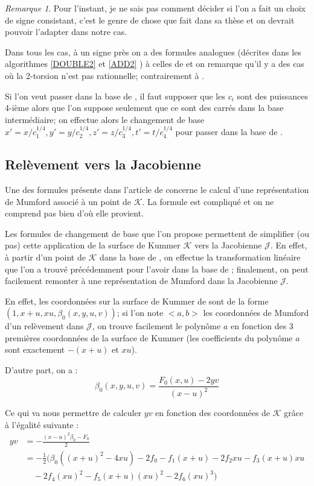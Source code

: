 \documentclass[a4paper]{article}
\theoremstyle{definition}
\theoremstyle{remark}
\newtheorem{remarque}{Remarque}
\numberwithin{equation}{section}
\begin{document}
\begin{remarque}
Pour l'instant, je ne sais pas comment décider si l'on a fait un choix de signe consistant, c'est le genre de chose que fait \citet{cosset} dans sa thèse et on devrait pouvoir l'adapter dans notre cas.
\end{remarque}

Dans tous les cas, à un signe près on a des formules analogues (décrites dans les algorithmes \ref{DOUBLE2} et \ref{ADD2} ) à celles de \citep{gaudry} et on remarque qu'il y a des cas où la 2-torsion n'est pas rationnelle; contrairement à \citep{gaudry}.

Si l'on veut passer dans la base de \citet{gaudry}, il faut supposer que les $c_i$ sont des puissances 4-ième alors que l'on suppose seulement que ce sont des carrés dans la base intermédiaire; on effectue alors le changement de base $x'=x/c_1^{1/4},y'=y/c_2^{1/4},z'=z/c_3^{1/4},t'=t/c_4^{1/4}$ pour passer dans la base de \citet{gaudry}.

\subsection{Relèvement vers la Jacobienne}
Une des formules présente dans l'article de \citep{gaudry} concerne le calcul d'une représentation de Mumford associé à un point de $\mathcal{K}$. La formule est compliqué et on ne comprend pas bien d'où elle provient.

Les formules de changement de base que l'on propose permettent de simplifier (ou pas) cette application de la surface de Kummer $\mathcal{K}$ vers la Jacobienne $\mathcal{J}$. En effet, à partir d'un point de $\mathcal{K}$ dans la base de \citet{gaudry}, on effectue la transformation linéaire que l'on a trouvé précédemment pour l'avoir dans la base de \citet{cassels-Flynn}; finalement, on peut facilement remonter à une représentation de Mumford dans la Jacobienne $\mathcal{J}$.

En effet, les coordonnées sur la surface de Kummer de \citet{cassels-Flynn} sont de la forme $(1,x+u,xu,\beta_0(x,y,u,v))$; si l'on note $<a,b>$ les coordonnées de Mumford d'un relèvement dans $\mathcal{J}$, on trouve facilement le polynôme $a$ en fonction des 3 premières coordonnées de la surface de Kummer (les coefficients du polynôme $a$ sont exactement $-(x+u)$ et $xu$).

D'autre part, on a :
$$\beta_0(x,y,u,v) = \frac{F_0(x,u)-2yv}{(x-u)^2}$$

Ce qui va nous permettre de calculer $yv$ en fonction des coordonnées de $\mathcal{K}$ grâce à l'égalité suivante :
\begin{align*}
yv &= -\frac{(x-u)^2\beta_0 - F_0}{2} \\
   &= -\frac{1}{2}(\beta_0((x+u)^2-4xu) - 2f_0 - f_1(x+u) - 2f_2xu - f_3(x+u)xu \\
   & \quad - 2f_4(xu)^2 - f_5(x+u)(xu)^2 - 2f_6(xu)^3)
\end{align*}
\end{document}
